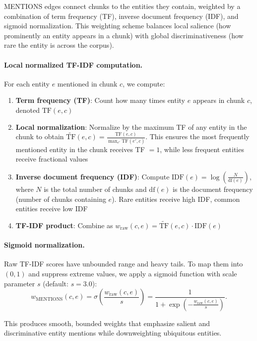 \documentclass[10pt]{article}
\begin{document}
MENTIONS edges connect chunks to the entities they contain, weighted by a combination of term frequency (TF), inverse document frequency (IDF), and sigmoid normalization. This weighting scheme balances local salience (how prominently an entity appears in a chunk) with global discriminativeness (how rare the entity is across the corpus).

\paragraph{Local normalized TF-IDF computation.} For each entity $e$ mentioned in chunk $c$, we compute:

\begin{enumerate}[itemsep=2pt]
    \item \textbf{Term frequency (TF)}: Count how many times entity $e$ appears in chunk $c$, denoted $\text{TF}(e,c)$
    \item \textbf{Local normalization}: Normalize by the maximum TF of any entity in the chunk to obtain $\widetilde{\text{TF}}(e,c) = \frac{\text{TF}(e,c)}{\max_{e'} \text{TF}(e',c)}$. This ensures the most frequently mentioned entity in the chunk receives TF $= 1$, while less frequent entities receive fractional values
    \item \textbf{Inverse document frequency (IDF)}: Compute $\text{IDF}(e) = \log\left(\frac{N}{\text{df}(e)}\right)$, where $N$ is the total number of chunks and $\text{df}(e)$ is the document frequency (number of chunks containing $e$). Rare entities receive high IDF, common entities receive low IDF
    \item \textbf{TF-IDF product}: Combine as $w_{\text{raw}}(c,e) = \widetilde{\text{TF}}(e,c) \cdot \text{IDF}(e)$
\end{enumerate}

\paragraph{Sigmoid normalization.} Raw TF-IDF scores have unbounded range and heavy tails. To map them into $(0,1)$ and suppress extreme values, we apply a sigmoid function with scale parameter $s$ (default: $s=3.0$):
\[
w_{\text{MENTIONS}}(c,e) = \sigma\left(\frac{w_{\text{raw}}(c,e)}{s}\right) = \frac{1}{1 + \exp\left(-\frac{w_{\text{raw}}(c,e)}{s}\right)}.
\]

This produces smooth, bounded weights that emphasize salient and discriminative entity mentions while downweighting ubiquitous entities.
\end{document}
